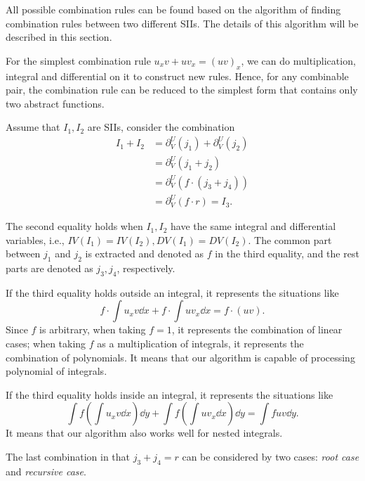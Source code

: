 All possible combination rules can be found based on the algorithm of finding combination rules between two different SIIs. The details of this algorithm will be described in this section. 

For the simplest combination rule $u_x v + u v_x = (uv)_x$, we can do multiplication, integral and  differential on it to construct new rules. Hence, for any combinable pair, the combination rule can be reduced to the simplest form that contains only two abstract functions. 

Assume that $I_1,I_2$ are SIIs, consider the combination 
\begin{equation}
\begin{split}
I_1+I_2 &= \partial^U_V(j_1) + \partial^U_V(j_2) \\
        &= \partial^U_V( j_1+j_2 )\\
        &= \partial^U_V( f\cdot(j_3+j_4) )\\ 
        &= \partial^U_V( f\cdot r ) = I_3 .
\end{split}
\label{combine_form}
\end{equation} 

The second equality holds when $I_1,I_2$ have the same integral and differential variables, i.e., $IV(I_1)=IV(I_2),DV(I_1)=DV(I_2)$. The common part between $j_1$ and $j_2$ is extracted and denoted as $f$ in the third equality, and the rest parts are denoted as $j_3,j_4$, respectively.

If the third equality holds outside an integral, it represents the situations like 
\begin{equation}
f\cdot\int\!{u_x v\dd x}+f\cdot\int\!{u v_x \dd x} = f\cdot(uv).
\end{equation} 
Since $f$ is arbitrary, when taking $f=1$, it represents the combination of linear cases; when taking $f$ as a multiplication of integrals, it represents the combination of polynomials. It means that our algorithm is capable of processing polynomial of integrals. 

If the third equality holds inside an integral, it represents the situations like 
\begin{equation}
\int\!{f \left(\int\!{u_x v\dd x}\right)\dd y}+\int\!{f \left(\int\!{u v_x \dd x}\right) \dd y} = \int\!{fuv\dd y}.
\end{equation}
It means that our algorithm also works well for nested integrals. 

The last combination in  that $j_3+j_4=r$ can be considered by two cases: \emph{root case} and \emph{recursive case}. 

